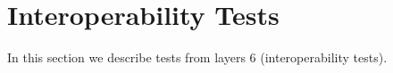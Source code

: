 \section{Interoperability Tests}

In this section we describe tests from layers 6 (interoperability tests). 

